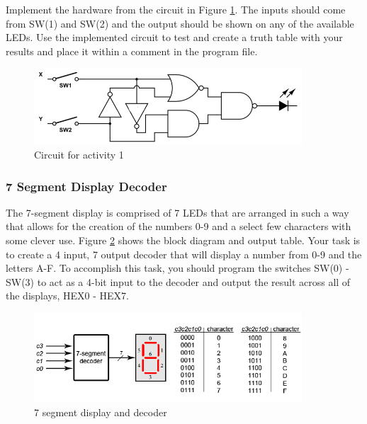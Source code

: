Implement the hardware from the circuit in Figure \ref{fig:circuit1}. The inputs should come from SW(1) and SW(2) and the output should be shown on any of the available LEDs. Use the implemented circuit to test and create a truth table with your results and place it within a comment in the program file.

\begin{figure}[H]
	\centering
	\includegraphics[width=100mm]{Lab1/figures/circuit1.png}
	\caption{Circuit for activity 1}
	\label{fig:circuit1}
\end{figure}

\subsubsection{7 Segment Display Decoder}

The 7-segment display is comprised of 7 LEDs that are arranged in such a way that allows for the creation of the numbers 0-9 and a select few characters with some clever use. Figure \ref{fig:7seg} shows the block diagram and output table. Your task is to create a 4 input, 7 output decoder that will display a number from 0-9 and the letters A-F. To accomplish this task, you should program the switches SW(0) - SW(3) to act as a 4-bit input to the decoder and output the result across all of the displays, HEX0 - HEX7.

\begin{figure}[H]
	\centering
	\includegraphics[width=100mm]{Lab1/figures/7seg.png}
	\caption{7 segment display and decoder}
	\label{fig:7seg}
\end{figure}

